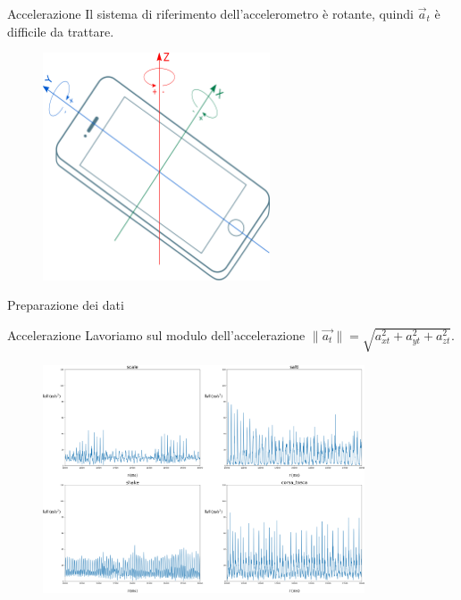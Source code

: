 \documentclass{beamer}
\newcommand{\separator}[1]{
\begin{frame}[sep]
\centering
\vspace*{\fill}
{\color{white}\huge #1}
\vspace*{\fill}
\end{frame}
}
\begin{document}
\begin{frame}{Accelerazione} %
Il sistema di riferimento dell'accelerometro è rotante, quindi $\vec{a}_t$ è difficile da trattare.
\begin{figure}[H]
\includegraphics[width=0.6\textwidth]{../figure/sensor_coordinate_system.png}
\end{figure}
\end{frame}

\separator{Preparazione dei dati}

\begin{frame}{Accelerazione}
Lavoriamo sul modulo dell'accelerazione $\|\vec{a_t}\| =\sqrt{a_{xt}^2+a_{yt}^2+a_{zt}^2}$.
\pause
\begin{figure}[H]
\includegraphics[width=0.85\textwidth]{../figure/espl.png}
\end{figure}
\end{frame}
\end{document}
